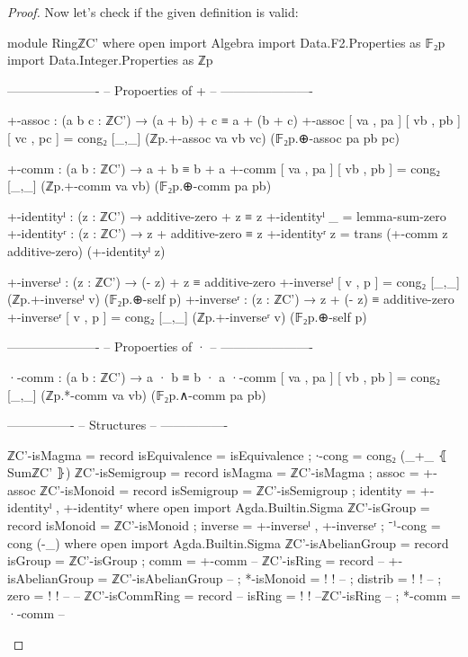 \documentclass[a4paper]{report}
\theoremstyle{definition}
\begin{document}
\begin{proof}
  Now let's check if the given definition is valid:
  \begin{code}
module RingℤC' where
  open import Algebra
  import Data.F2.Properties as 𝔽₂p
  import Data.Integer.Properties as ℤp

  ----------------------
  -- Propoerties of + --
  ----------------------

  +-assoc : (a b c : ℤC') → (a + b) + c ≡ a + (b + c)
  +-assoc [ va , pa ] [ vb , pb ] [ vc , pc ] = cong₂ [_,_] (ℤp.+-assoc va vb vc) (𝔽₂p.⊕-assoc pa pb pc)

  +-comm : (a b : ℤC') → a + b ≡ b + a
  +-comm [ va , pa ] [ vb , pb ] = cong₂ [_,_] (ℤp.+-comm va vb) (𝔽₂p.⊕-comm pa pb)

  +-identityˡ : (z : ℤC') → additive-zero + z ≡ z
  +-identityˡ _ = lemma-sum-zero
  +-identityʳ : (z : ℤC') → z + additive-zero ≡ z
  +-identityʳ z = trans (+-comm z additive-zero) (+-identityˡ z)

  +-inverseˡ : (z : ℤC') → (- z) + z ≡ additive-zero
  +-inverseˡ [ v , p ] = cong₂ [_,_] (ℤp.+-inverseˡ v) (𝔽₂p.⊕-self p)
  +-inverseʳ : (z : ℤC') → z + (- z) ≡ additive-zero
  +-inverseʳ [ v , p ] = cong₂ [_,_] (ℤp.+-inverseʳ v) (𝔽₂p.⊕-self p)

  ----------------------
  -- Propoerties of · --
  ----------------------

  ·-comm : (a b : ℤC') → a · b ≡ b · a
  ·-comm [ va , pa ] [ vb , pb ] = cong₂ [_,_] (ℤp.*-comm va vb) (𝔽₂p.∧-comm pa pb)

  ----------------
  -- Structures --
  ----------------

  ℤC'-isMagma = record
    { isEquivalence = isEquivalence
    ; ∙-cong        =  cong₂ (_+_ ⦃ SumℤC' ⦄)
    }
  ℤC'-isSemigroup = record
    { isMagma = ℤC'-isMagma
    ; assoc   = +-assoc
    }
  ℤC'-isMonoid = record
    { isSemigroup = ℤC'-isSemigroup
    ; identity    = +-identityˡ , +-identityʳ
    }
    where open import Agda.Builtin.Sigma
  ℤC'-isGroup = record
    { isMonoid = ℤC'-isMonoid
    ; inverse  = +-inverseˡ , +-inverseʳ
    ; ⁻¹-cong  = cong (-_)
    }
    where open import Agda.Builtin.Sigma
  ℤC'-isAbelianGroup = record
    { isGroup = ℤC'-isGroup
    ; comm    = +-comm
    }
  -- ℤC'-isRing = record
  --   { +-isAbelianGroup = ℤC'-isAbelianGroup
  --   ; *-isMonoid       = {!   !}
  --   ; distrib          = {!   !}
  --   ; zero             = {!   !}
  --   }
  -- ℤC'-isCommRing = record
  --   { isRing = {!   !} --ℤC'-isRing
  --   ; *-comm = ·-comm
  --   }

  \end{code}
\end{proof}
\end{document}

